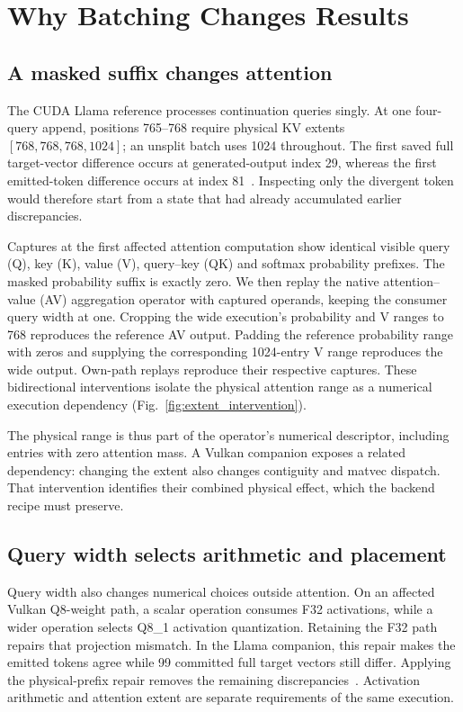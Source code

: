 \section{Why Batching Changes Results}
\label{sec:reference}
\subsection{A masked suffix changes attention}
The CUDA Llama reference processes continuation queries singly. At one four-query append, positions 765--768 require physical KV extents $[768,768,768,1024]$; an unsplit batch uses 1024 throughout. The first saved full target-vector difference occurs at generated-output index 29, whereas the first emitted-token difference occurs at index 81~\cite{records}. Inspecting only the divergent token would therefore start from a state that had already accumulated earlier discrepancies.

Captures at the first affected attention computation show identical visible query (Q), key (K), value (V), query--key (QK) and softmax probability prefixes. The masked probability suffix is exactly zero. We then replay the native attention--value (AV) aggregation operator with captured operands, keeping the consumer query width at one. Cropping the wide execution's probability and V ranges to 768 reproduces the reference AV output. Padding the reference probability range with zeros and supplying the corresponding 1024-entry V range reproduces the wide output. Own-path replays reproduce their respective captures. These bidirectional interventions isolate the physical attention range as a numerical execution dependency (Fig.~\ref{fig:extent_intervention}).



The physical range is thus part of the operator's numerical descriptor, including entries with zero attention mass. A Vulkan companion exposes a related dependency: changing the extent also changes contiguity and matvec dispatch. That intervention identifies their combined physical effect, which the backend recipe must preserve.

\subsection{Query width selects arithmetic and placement}
Query width also changes numerical choices outside attention. On an affected Vulkan Q8-weight path, a scalar operation consumes F32 activations, while a wider operation selects Q8\_1 activation quantization. Retaining the F32 path repairs that projection mismatch. In the Llama companion, this repair makes the emitted tokens agree while 99 committed full target vectors still differ. Applying the physical-prefix repair removes the remaining discrepancies~\cite{records}. Activation arithmetic and attention extent are separate requirements of the same execution.

